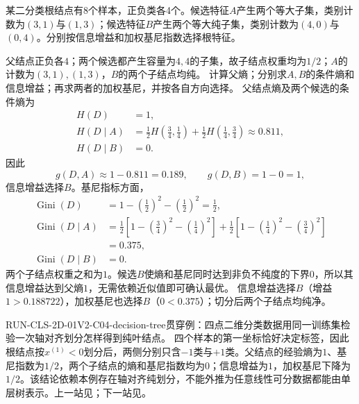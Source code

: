 \label{struct:V2-C04-CH32}
\begin{example}[信息增益与基尼一致选择纯划分]\label{exm:V2-C04-split-choice}
某二分类根结点有8个样本，正负类各4个。候选特征$A$产生两个等大子集，类别计数为$(3,1)$与$(1,3)$；候选特征$B$产生两个等大纯子集，类别计数为$(4,0)$与$(0,4)$。分别按信息增益和加权基尼指数选择根特征。

\label{struct:V2-C04-CH33}
\end{example}
\begin{solution}
\SolGiven 父结点正负各$4$；两个候选都产生容量为$4,4$的子集，故子结点权重均为$1/2$；$A$的计数为$(3,1),(1,3)$，$B$的两个子结点均纯。
\SolPlan 计算父熵；分别求$A,B$的条件熵和信息增益；再求两者的加权基尼，并按各自方向选择。
\SolDerive
父结点熵及两个候选的条件熵为
\[
\begin{aligned}
H(D)&=1,\\
H(D\mid A)
&=\frac12H\!\left(\frac34,\frac14\right)
 +\frac12H\!\left(\frac14,\frac34\right)
\approx0.811,\\
H(D\mid B)&=0.
\end{aligned}
\]
因此
\[
g(D,A)\approx1-0.811=0.189,
\qquad
g(D,B)=1-0=1,
\]
信息增益选择$B$。基尼指标方面，
\[
\begin{aligned}
\operatorname{Gini}(D)&=1-\left(\frac12\right)^2-\left(\frac12\right)^2=\frac12,\\
\operatorname{Gini}(D\mid A)
&=\frac12\left[1-\left(\frac34\right)^2-\left(\frac14\right)^2\right]
 +\frac12\left[1-\left(\frac14\right)^2-\left(\frac34\right)^2\right]\\
&=0.375,\\
\operatorname{Gini}(D\mid B)&=0.
\end{aligned}
\]
\SolCheck 两个子结点权重之和为$1$。候选$B$使熵和基尼同时达到非负不纯度的下界$0$，所以其信息增益达到父熵$1$，无需依赖近似值即可确认最优。
\SolAnswer 信息增益选择$B$（增益$1>0.188722$），加权基尼也选择$B$（$0<0.375$）；切分后两个子结点均纯净。
\end{solution}

\begin{SLRunningExample}{RUN-CLS-2D-01}{V2-C04-decision-tree}{贯穿例：四点二维分类数据}{用同一训练集检验一次轴对齐划分怎样得到纯叶结点。}
四个样本的第一坐标恰好决定标签，因此根结点按$x^{(1)}<0$划分后，两侧分别只含$-1$类与$+1$类。父结点的经验熵为$1$、基尼指数为$1/2$，两个子结点的熵和基尼指数均为$0$；信息增益为$1$，加权基尼下降为$1/2$。该结论依赖本例存在轴对齐纯划分，不能外推为任意线性可分数据都能由单层树表示。上一站见；下一站见。
\end{SLRunningExample}


